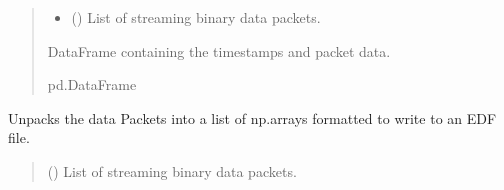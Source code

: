 \documentclass[letterpaper,10pt,english]{sphinxmanual}
\begin{document}
\begin{fulllineitems}
\begin{fulllineitems}
\begin{quote}
\begin{description}
\begin{itemize}
\item {} 
\sphinxAtStartPar
{} (\sphinxstyleliteralemphasis{\sphinxupquote{{[}}}{\hyperref[\detokenize{PodApi.Packets:PodApi.Packets.Packet.Packet}]{\sphinxcrossref{\sphinxstyleliteralemphasis{\sphinxupquote{Packet}}}}}\sphinxstyleliteralemphasis{\sphinxupquote{ | }}\sphinxstyleliteralemphasis{\sphinxupquote{{]}}}) \textendash{} List of streaming binary data packets.

\end{itemize}

\sphinxAtStartPar
DataFrame containing the timestamps and packet data.

\sphinxAtStartPar
pd.DataFrame

\end{description}\end{quote}

\end{fulllineitems}


\begin{fulllineitems}
\label{\detokenize{PodApi.Stream.PodHandler:PodApi.Stream.PodHandler.Handle8274D.Drain8274D.DropToListOfArrays}}
\pysigstartsignatures
{}
\pysigstopsignatures
\sphinxAtStartPar
Unpacks the data Packets into a list of np.arrays formatted to write to an EDF file.
\begin{quote}\begin{description}
\sphinxAtStartPar
{} (\sphinxstyleliteralemphasis{\sphinxupquote{{[}}}{\hyperref[\detokenize{PodApi.Packets:PodApi.Packets.Packet.Packet}]{\sphinxcrossref{\sphinxstyleliteralemphasis{\sphinxupquote{Packet}}}}}\sphinxstyleliteralemphasis{\sphinxupquote{ | }}\sphinxstyleliteralemphasis{\sphinxupquote{{]}}}) \textendash{} List of streaming binary data packets.


\end{description}
\end{quote}
\end{fulllineitems}
\end{fulllineitems}
\end{document}
